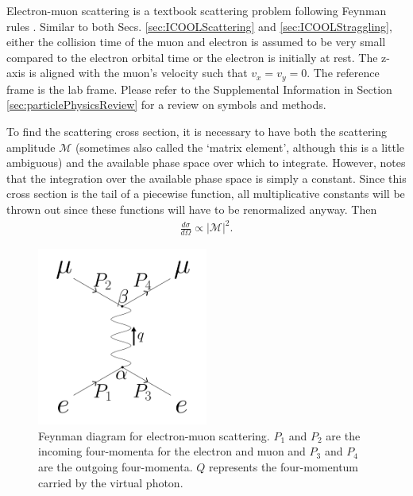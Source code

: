 \label{ssc:COSYTheoreticalDerivation}

Electron-muon scattering is a textbook scattering problem following Feynman rules \cite{griffithspp}. Similar to both Secs. \ref{sec:ICOOLScattering} and \ref{sec:ICOOLStraggling}, either the collision time of the muon and electron is assumed to be very small compared to the electron orbital time or the electron is initially at rest. The z-axis is aligned with the muon's velocity such that $v_x=v_y=0$. The reference frame is the lab frame. Please refer to the Supplemental Information in Section \ref{sec:particlePhysicsReview} for a review on symbols and methods.

To find the scattering cross section, it is necessary to have both the scattering amplitude $\mathcal{M}$ (sometimes also called the `matrix element', although this is a little ambiguous) and the available phase space over which to integrate. However, \cite{griffithspp} notes that the integration over the available phase space is simply a constant. Since this cross section is the tail of a piecewise function, all multiplicative constants will be thrown out since these functions will have to be renormalized anyway. Then
\begin{align*}
\frac{d\sigma}{d\Omega}\propto |\mathcal{M}|^2.
\end{align*}

\begin{figure}
  \centering
    \includegraphics[width=0.5\textwidth]{Figures/MottFeynman} 
  \caption{Feynman diagram for electron-muon scattering. $P_1$ and $P_2$ are the incoming four-momenta for the electron and muon and $P_3$ and $P_4$ are the outgoing four-momenta. $Q$ represents the four-momentum carried by the virtual photon.}
  \label{fig:mottFeynman}
\end{figure}

